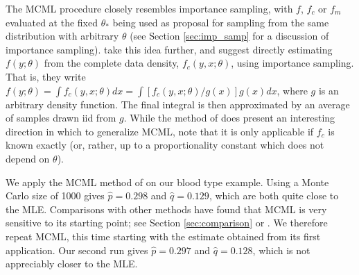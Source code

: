 \documentclass[ss]{imsart}
\theoremstyle{plain}
\theoremstyle{definition}
\theoremstyle{remark}
\begin{document}
The MCML procedure closely resembles importance sampling, with $f$, $f_c$ or $f_m$ evaluated at the fixed $\theta_*$ being used as proposal for sampling from the same distribution with arbitrary $\theta$ (see Section \ref{sec:imp_samp} for a discussion of importance sampling). \citet{Jan03} take this idea further, and suggest directly estimating $f(y; \theta)$ from the complete data density, $f_c(y, x; \theta)$, using importance sampling. That is, they write $f(y; \theta) = \int f_c(y, x; \theta) dx = \int [ f_c(y, x; \theta) / g(x)] g(x) dx$, where $g$ is an arbitrary density function. The final integral is then approximated by an average of samples drawn iid from $g$. While the method of \citeauthor{Jan03} does present an interesting direction in which to generalize MCML, note that it is only applicable if $f_c$ is known exactly (or, rather, up to a proportionality constant which does not depend on $\theta$).

We apply the MCML method of \citet{Gey94} on our blood type example. Using a Monte Carlo size of 1000 gives $\hat{p} = 0.298$ and $\hat{q} = 0.129$, which are both quite close to the MLE. Comparisons with other methods have found that MCML is very sensitive to its starting point; see Section \ref{sec:comparison} or \citet{McC97}. We therefore repeat MCML, this time starting with the estimate obtained from its first application. Our second run gives $\hat{p} = 0.297$ and $\hat{q} = 0.128$, which is not appreciably closer to the MLE.
\end{document}
